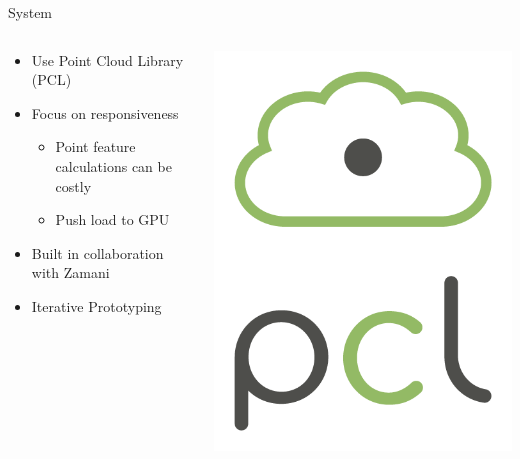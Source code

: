 \documentclass[compress]{beamer}
\begin{document}
\begin{frame}{System}

\begin{columns}[T]
\begin{column}{0.7\textwidth}

\begin{itemize}

\item Use Point Cloud Library (PCL)
\item Focus on responsiveness

\begin{itemize}
\item Point feature calculations can be costly
\item Push load to GPU
\end{itemize}

\item Built in collaboration with Zamani
\item Iterative Prototyping

\end{itemize}


\end{column}
\begin{column}{0.3\textwidth}

\includegraphics[height=0.5\textheight]{pics/pcl_vert_large_pos.png}

\end{column}
\end{columns}

\end{frame}
\end{document}
